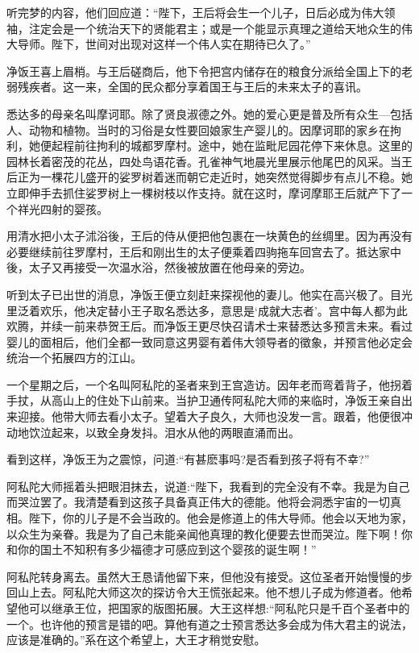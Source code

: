 \documentclass[12pt,twoside,openany]{book}
\begin{document}
听完梦的内容，他们回应道：“陛下，王后将会生一个儿子，日后必成为伟大领袖，注定会是一个统治天下的贤能君主；或是一个能显示真理之道给天地众生的伟大导师。陛下，世间对出现对这样一个伟人实在期待已久了。”

净饭王喜上眉梢。与王后磋商后，他下令把宫内储存在的粮食分派给全国上下的老弱残疾者。这一来，全国的民众都分享着国王与王后的未来太子的喜讯。

悉达多的母亲名叫摩诃耶。除了贤良淑德之外。她的爱心更是普及所有众生—包括人、动物和植物。当时的习俗是女性要回娘家生产婴儿的。因摩诃耶的家乡在拘利，她便起程前往拘利的城都罗摩村。途中，她在监毗尼园花停下来休息。这里的园林长着密茂的花丛，四处鸟语花香。孔雀神气地晨光里展示他尾巴的风采。当王后正为一棵花儿盛开的娑罗树着迷而朝它走近时，她突然觉得脚步有点儿不稳。她立即伸手去抓住娑罗树上一棵树枝以作支持。就在这时，摩诃摩耶王后就产下了一个祥光四射的婴孩。

用清水把小太子沭浴後，王后的侍从便把他包裹在一块黄色的丝绸里。因为再没有必要继续前往罗摩村，王后和刚出生的太子便乘着四驹拖车回宫去了。抵达家中後，太子又再接受一次温水浴，然後被放置在他母亲的旁边。

听到太子已出世的消息，净饭王便立刻赶来探视他的妻儿。他实在高兴极了。目光里泛着欢乐，他决定替小王子取名悉达多，意思是‘成就大志者’。宫中每人都为此欢腾，并续一前来恭贺王后。而净饭王更尽快召请术士来替悉达多预言未来。看过婴儿的面相后，他们全都一致同意这男婴有着伟大领导者的徵象，并预言他必定会统治一个拓展四方的江山。

一个星期之后，一个名叫阿私陀的圣者来到王宫造访。因年老而弯着背子，他拐着手扙，从高山上的住处下山前来。当护卫通传阿私陀大师的来临时，净饭王亲自出来迎接。他带大师去看小太子。望着大子良久，大师也没发一言。跟着，他便很冲动地饮泣起来，以致全身发抖。泪水从他的两眼直涌而出。

看到这样，净饭王为之震惊，问道:“有甚麽事吗?是否看到孩子将有不幸?”

阿私陀大师摇着头把眼泪抹去，说道:“陛下，我看到的完全没有不幸。我是为自己而哭泣罢了。我清楚看到这孩子具备真正伟大的德能。他将会洞悉宇宙的一切真相。陛下，你的儿子是不会当政的。他会是修道上的伟大导师。他会以天地为家，以众生为亲眷。我是为了自己未能亲闻他真理的教化便要去世而哭泣。陛下啊！你和你的国土不知积有多少福德才可感应到这个婴孩的诞生啊！”

阿私陀转身离去。虽然大王恳请他留下来，但他没有接受。这位圣者开始慢慢的步回山上去。阿私陀大师这次的探访令大王慌张起来。他不想儿子成为修道者。他希望他可以继承王位，把国家的版图拓展。大王这样想:“阿私陀只是千百个圣者中的一个。也许他的预言是错的吧。算他有道之士预言悉达多会成为伟大君主的说法，应该是准确的。”系在这个希望上，大王才稍觉安慰。
\end{document}

